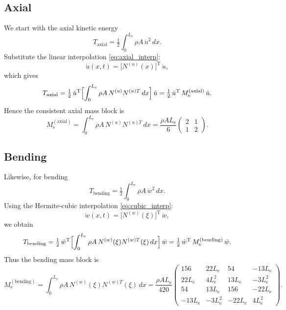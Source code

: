 \documentclass{article}
\begin{document}
	\subsection{Axial}
	We start with the axial kinetic energy
	\begin{equation}
		T_{\mathrm{axial}}
		= \tfrac12\int_0^{L_\mathrm{e}}\rho A\,\dot u^2\,dx.
	\end{equation}
	Substitute the linear interpolation \eqref{eq:axial_interp}:
	\begin{equation}
		\dot u(x,t)
		= \bigl[N^{(u)}(x)\bigr]^\text{T}\,\dot{{u}},
	\end{equation}
	which gives
	\begin{equation}
		T_{\mathrm{axial}}
		= \tfrac12\,\dot{{u}}^\text{T}
		\Bigl[\int_0^{L_\mathrm{e}}\rho A\,N^{(u)}N^{(u)T}\,dx\Bigr]
		\,\dot{{u}}
		= \tfrac12\,\dot{{u}}^\text{T}\,M_\mathrm{e}^{(\mathrm{axial})}\,\dot{{u}}.
	\end{equation}
	Hence the consistent axial mass block is
	\begin{equation}\label{eq:me_axial}
		M_\mathrm{e}^{(\mathrm{axial})}
		= \int_0^{L_\mathrm{e}}\rho A\,N^{(u)}N^{(u)T}\,dx
		= \frac{\rho A L_\mathrm{e}}{6}
		\begin{pmatrix}2 & 1\\ 1 & 2\end{pmatrix}.
	\end{equation}
	
	\subsection{Bending}
	Likewise, for bending
	\begin{equation}
		T_{\mathrm{bending}}
		= \tfrac12\int_0^{L_\mathrm{e}}\rho A\,\dot w^2\,dx.
	\end{equation}
	Using the Hermite‐cubic interpolation \eqref{eq:cubic_interp}:
	\begin{equation}
		\dot w(x,t)
		= \bigl[N^{(w)}(\xi)\bigr]^\text{T}\,\dot{{w}},
	\end{equation}
	we obtain
	\begin{equation}
		T_{\mathrm{bending}}
		= \tfrac12\,\dot{{w}}^\text{T}
		\Bigl[\int_0^{L_\mathrm{e}}\rho A\,N^{(w)}(\xi)N^{(w)T}(\xi)\,dx\Bigr]
		\,\dot{{w}}
		= \tfrac12\,\dot{{w}}^\text{T}\,M_\mathrm{e}^{(\mathrm{bending})}\,\dot{{w}}.
	\end{equation}
	Thus the bending mass block is
	\begin{equation}\label{eq:me_bending}
		M_\mathrm{e}^{(\mathrm{bending})}
		= \int_0^{L_\mathrm{e}}\rho A\,N^{(w)}(\xi)N^{(w)T}(\xi)\,dx
		= \frac{\rho A L_\mathrm{e}}{420}
		\begin{pmatrix}
			156 & 22L_\mathrm{e} & 54 & -13L_\mathrm{e}\\
			22L_\mathrm{e} & 4L_\mathrm{e}^2 & 13L_\mathrm{e} & -3L_\mathrm{e}^2\\
			54 & 13L_\mathrm{e} & 156 & -22L_\mathrm{e}\\
			-13L_\mathrm{e} & -3L_\mathrm{e}^2 & -22L_\mathrm{e} & 4L_\mathrm{e}^2
		\end{pmatrix}.
	\end{equation}
	
\end{document}
